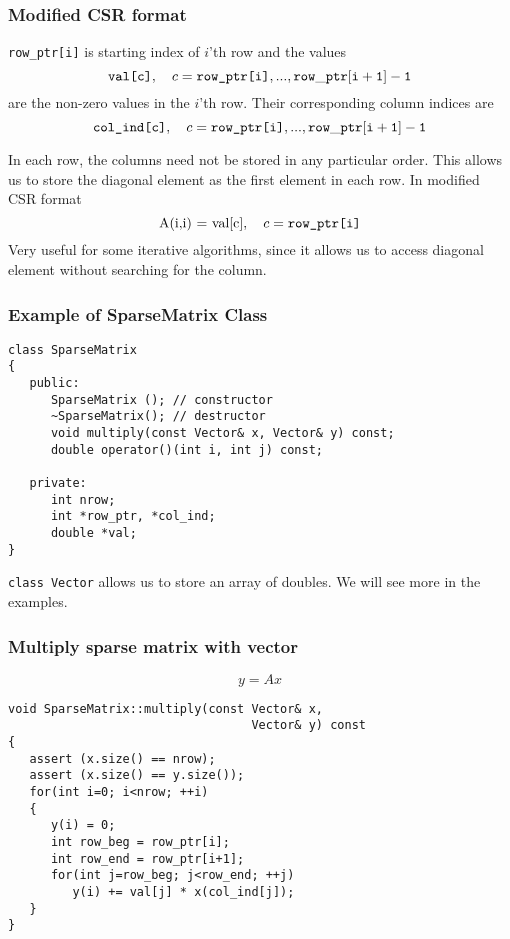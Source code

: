 \documentclass[10pt,xcolor=svgnames]{beamer}
\begin{document}
\begin{frame}
\frametitle{Modified CSR format}
{\tt row\_ptr[i]} is starting index of $i$'th row and the values
\[
\textrm{\tt val[c]}, \quad c = \textrm{\tt row\_ptr[i]}, ..., {\tt row\_ptr[i+1]-1}
\]
are the non-zero values in the $i$'th row. Their corresponding column indices are
\[
\textrm{\tt col\_ind[c]}, \quad c = \textrm{\tt row\_ptr[i]}, ..., {\tt row\_ptr[i+1]-1}
\]

\vspace{5mm}

In each row, the columns need not be stored in any particular order. This allows us to store the diagonal element as the first element in each row. In modified CSR format
\[
\textrm{A(i,i) = val[c]}, \quad c = \textrm{\tt row\_ptr[i]}
\]
Very useful for some iterative algorithms, since it allows us to access diagonal element without searching for the column.
\end{frame}
\begin{frame}[fragile]
\frametitle{Example of SparseMatrix Class}

\begin{lstlisting}
class SparseMatrix
{
   public:
      SparseMatrix (); // constructor
      ~SparseMatrix(); // destructor
      void multiply(const Vector& x, Vector& y) const;
      double operator()(int i, int j) const;

   private:
      int nrow;
      int *row_ptr, *col_ind;
      double *val;
}
\end{lstlisting}
{\tt class Vector} allows us to store an array of doubles. We will see more in the examples.
\end{frame}
\begin{frame}[fragile]
\frametitle{Multiply sparse matrix with vector}

\[
y = A x
\]

\begin{lstlisting}
void SparseMatrix::multiply(const Vector& x,
                                  Vector& y) const
{
   assert (x.size() == nrow);
   assert (x.size() == y.size());
   for(int i=0; i<nrow; ++i)
   {
      y(i) = 0;
      int row_beg = row_ptr[i];
      int row_end = row_ptr[i+1];
      for(int j=row_beg; j<row_end; ++j)
         y(i) += val[j] * x(col_ind[j]);
   }
}
\end{lstlisting}

\end{frame}
\end{document}
